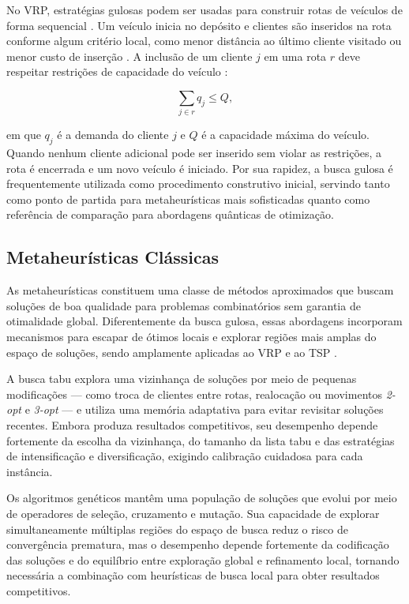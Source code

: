 No VRP, estratégias gulosas podem ser usadas para construir rotas de veículos de forma sequencial \cite{mole1976sequential}. Um veículo inicia no depósito e clientes são inseridos na rota conforme algum critério local, como menor distância ao último cliente visitado ou menor custo de inserção \cite{solomon1987algorithms}. A inclusão de um cliente $j$ em uma rota $r$ deve respeitar restrições de capacidade do veículo \cite{toth2014vehicle}:

\begin{equation*}
    \sum_{j \in r} q_j \leq Q,
\end{equation*}

\noindent em que $q_j$ é a demanda do cliente $j$ e $Q$ é a capacidade máxima do veículo. Quando nenhum cliente adicional pode ser inserido sem violar as restrições, a rota é encerrada e um novo veículo é iniciado. Por sua rapidez, a busca gulosa é frequentemente utilizada como procedimento construtivo inicial, servindo tanto como ponto de partida para metaheurísticas mais sofisticadas \cite{gendreau1996stochastic} quanto como referência de comparação para abordagens quânticas de otimização.

\subsection{Metaheurísticas Clássicas}

As metaheurísticas constituem uma classe de métodos aproximados que buscam soluções de boa qualidade para problemas combinatórios sem garantia de otimalidade global. Diferentemente da busca gulosa, essas abordagens incorporam mecanismos para escapar de ótimos locais e explorar regiões mais amplas do espaço de soluções, sendo amplamente aplicadas ao VRP e ao TSP \cite{golden2008vehicle, toth2002vehicle}.

A busca tabu \cite{glover1989tabu, glover1990tabu} explora uma vizinhança de soluções por meio de pequenas modificações — como troca de clientes entre rotas, realocação ou movimentos \textit{2-opt} e \textit{3-opt} — e utiliza uma memória adaptativa para evitar revisitar soluções recentes. Embora produza resultados competitivos, seu desempenho depende fortemente da escolha da vizinhança, do tamanho da lista tabu e das estratégias de intensificação e diversificação, exigindo calibração cuidadosa para cada instância.

Os algoritmos genéticos \cite{holland1992adaptation, goldberg1989genetic} mantêm uma população de soluções que evolui por meio de operadores de seleção, cruzamento e mutação. Sua capacidade de explorar simultaneamente múltiplas regiões do espaço de busca reduz o risco de convergência prematura, mas o desempenho depende fortemente da codificação das soluções e do equilíbrio entre exploração global e refinamento local, tornando necessária a combinação com heurísticas de busca local para obter resultados competitivos.

